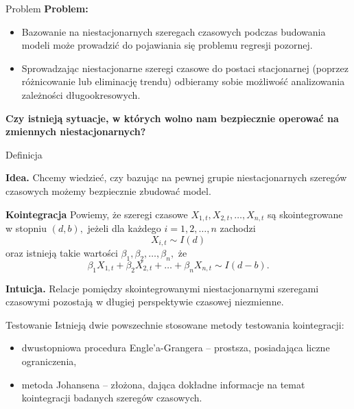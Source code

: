 \documentclass[a4paper, 11pt]{beamer}
\begin{document}
	\begin{frame}{Problem}
		\textbf{Problem:}
		\begin{itemize}
			\item Bazowanie na niestacjonarnych szeregach czasowych podczas 
				budowania modeli może prowadzić do pojawiania się problemu
				regresji pozornej.
			\item Sprowadzając niestacjonarne szeregi czasowe do postaci
				stacjonarnej (poprzez różnicowanie lub eliminację trendu) odbieramy
				sobie możliwość analizowania zależności długookresowych.
		\end{itemize}
		\begin{center}
			\textbf{
				Czy istnieją sytuacje, w których wolno nam bezpiecznie operować na
					zmiennych niestacjonarnych?
			}
		\end{center}
	\end{frame}
	
	\begin{frame}{Definicja}
		\begin{alert}{\textbf{Idea.}}
			Chcemy wiedzieć, czy bazując na pewnej grupie niestacjonarnych 
			szeregów czasowych możemy bezpiecznie zbudować model.
		\end{alert}
		\begin{block}{\textbf{Kointegracja}}
			Powiemy, że szeregi czasowe $X_{1,t}, X_{2,t}, \ldots, X_{n,t}$ są skointegrowane w stopniu $\left(d,b\right),$ jeżeli dla każdego $i=1,2,\ldots,n$ zachodzi \[
				X_{i,t} \sim I\left(d\right)
			\] oraz istnieją takie wartości $\beta_1,\beta_2,\ldots,\beta_n,$ że \[
				\beta_1 X_{1,t} + \beta_2 X_{2,t} + \ldots + \beta_n X_{n,t} \sim I\left(d - b\right).
			\]
		\end{block}
		\begin{alert}{\textbf{Intuicja.}}
			Relacje pomiędzy skointegrowanymi niestacjonarnymi szeregami 
			czasowymi pozostają w długiej perspektywie czasowej niezmienne.
		\end{alert}
	\end{frame}

	\begin{frame}{Testowanie}
		Istnieją dwie powszechnie stosowane metody testowania kointegracji:
		\begin{itemize}
			\item dwustopniowa procedura Engle'a-Grangera -- prostsza, 
				posiadająca liczne ograniczenia,
			\item metoda Johansena -- złożona, dająca dokładne informacje na temat
				kointegracji badanych szeregów czasowych.
		\end{itemize}
	\end{frame}
	
\end{document}
